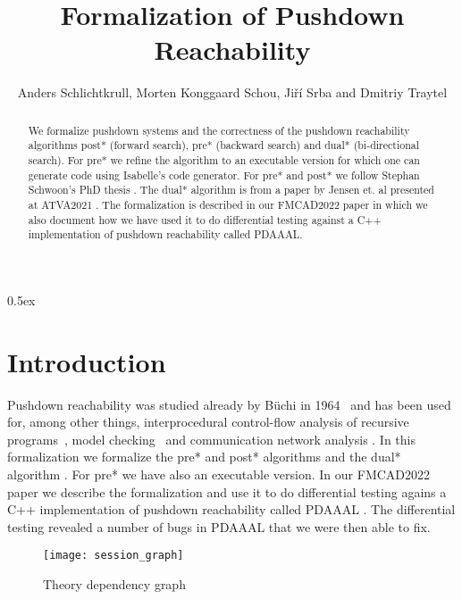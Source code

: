 \documentclass[10pt,a4paper]{article}
\begin{document}
\title{Formalization of Pushdown Reachability}
\author{Anders Schlichtkrull, Morten Konggaard Schou, Ji\v{r}\'i Srba and Dmitriy Traytel}
\date{}

\maketitle

\begin{abstract}
\noindent
We formalize pushdown systems and the correctness of the pushdown reachability algorithms post* (forward search), pre* (backward search) and dual* (bi-directional search).
For pre* we refine the algorithm to an executable version for which one can generate code using Isabelle's code generator.
For pre* and post* we follow Stephan Schwoon's PhD thesis \cite{schwoon2002model}. The dual* algorithm is from a paper by Jensen et. al presented at ATVA2021 \cite{DBLP:conf/atva/JensenSSSVD21}.
The formalization is described in our FMCAD2022 paper \cite{DBLP:conf/fmcad/SchlichtkrullSST22} in which we also document how we have used it to do differential
testing against a C++ implementation of pushdown reachability called PDAAAL.


\end{abstract}

\tableofcontents

\newpage

\parindent 0pt
\parskip 0.5ex

\section{Introduction}
Pushdown reachability was studied already by B{\"u}chi in 1964~\cite{buchi1964regular} and has been used for, among other things, 
interprocedural control-flow analysis of recursive programs~\cite{esparza1999automata,conway2005incremental}, 
model checking~\cite{esparza2001bdd,moped,jmoped,bouajjani1997reachability} and communication network analysis \cite{JKMSST:coNEXT:18,jensen2020aalwines,DJJKMSST:TON:21}.
In this formalization we formalize the pre* and post* algorithms \cite{schwoon2002model} and the dual* algorithm \cite{DBLP:conf/atva/JensenSSSVD21}. For pre* we have also an executable version.
In our FMCAD2022 paper \cite{DBLP:conf/fmcad/SchlichtkrullSST22} we describe the formalization and use it to
do differential testing agains a C++ implementation of pushdown reachability called PDAAAL \cite{DBLP:conf/atva/JensenSSSVD21}.
The differential testing revealed a number of bugs in PDAAAL that we were then able to fix.

\begin{figure}
\begin{center}
  \texttt{[image: session\_graph]}
\end{center}
\caption{Theory dependency graph}
\label{fig:thys}
\end{figure}

\newpage





\end{document}

